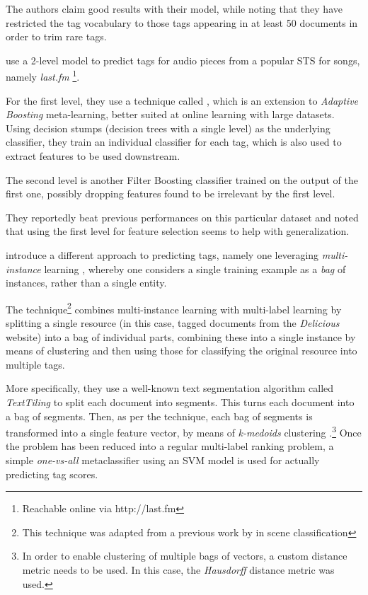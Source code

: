 The authors claim good results with their model, while noting that they have restricted the tag vocabulary to those tags appearing in at least 50 documents in order to trim rare tags.

\cite{bertin-mahieux_etal_2008} use a 2-level model to predict tags for audio pieces from a popular STS for songs, namely \textit{last.fm} \footnote{Reachable online via http://last.fm}.

For the first level, they use a technique called , which is an extension to \textit{Adaptive Boosting} meta-learning, better suited at online learning with large datasets. Using decision stumps (decision trees with a single level) as the underlying classifier, they train an individual classifier for each tag, which is also used to extract features to be used downstream.

The second level is another Filter Boosting classifier trained on the output of the first one, possibly dropping features found to be irrelevant by the first level.

They reportedly beat previous performances on this particular dataset and noted that using the first level for feature selection seems to help with generalization.

\cite{shen_etal_2009} introduce a different approach to predicting tags, namely one leveraging \textit{multi-instance} learning \citep{dietterich_etal_1997}, whereby one considers a single training example as a \textit{bag} of instances, rather than a single entity.

The technique\footnote{This technique was adapted from a previous work by \cite{zhou_zhang_2006} in scene classification} combines multi-instance learning with multi-label learning by splitting a single resource (in this case, tagged documents from the \textit{Delicious} website) into a bag of individual parts, combining these into a single instance by means of clustering and then using those for classifying the original resource into multiple tags.

More specifically, they use a well-known text segmentation algorithm called \textit{TextTiling} \citep{hearst_1994} to split each document into segments. This turns each document into a bag of segments. Then, as per the technique, each bag of segments is transformed into a single feature vector, by means of \textit{k-medoids} clustering \citep{kaufmanl_rousseeuw_1987}.\footnote{In order to enable clustering of multiple bags of vectors, a custom distance metric needs to be used. In this case, the  \textit{Hausdorff} distance metric \citep{huttenlocher_etal_1993} was used.} Once the problem has been reduced into a regular multi-label ranking problem, a simple \textit{one-vs-all} metaclassifier using an SVM model is used for actually predicting  tag scores.

